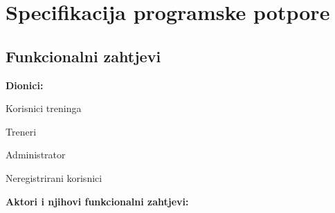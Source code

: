 \chapter{Specifikacija programske potpore}
		
	\section{Funkcionalni zahtjevi}
			
			
			\noindent \textbf{Dionici:}
			
			\begin{packed_enum}

				 \item Korisnici treninga
				 \item Treneri
			     \item Administrator
			     \item Neregistrirani korisnici

				
			\end{packed_enum}
			
			\noindent \textbf{Aktori i njihovi funkcionalni zahtjevi:}
			
